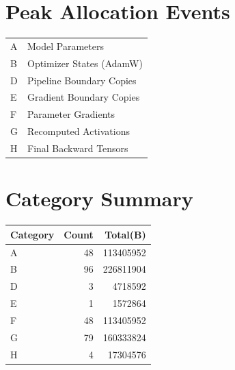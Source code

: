 \documentclass{article}
\begin{document}
\section*{Peak Allocation Events}
\small
\begin{tabular}{ll}
A & Model Parameters \\
B & Optimizer States (AdamW) \\
D & Pipeline Boundary Copies \\
E & Gradient Boundary Copies \\
F & Parameter Gradients \\
G & Recomputed Activations \\
H & Final Backward Tensors \\
\end{tabular}
\vspace{0.5em}
\section*{Category Summary}
\begin{tabular}{l r r}
Category & Count & Total(B) \\
\hline
A & 48 & 113405952 \\
B & 96 & 226811904 \\
D & 3 & 4718592 \\
E & 1 & 1572864 \\
F & 48 & 113405952 \\
G & 79 & 160333824 \\
H & 4 & 17304576 \\
\end{tabular}
\vspace{0.5em}
\end{document}
